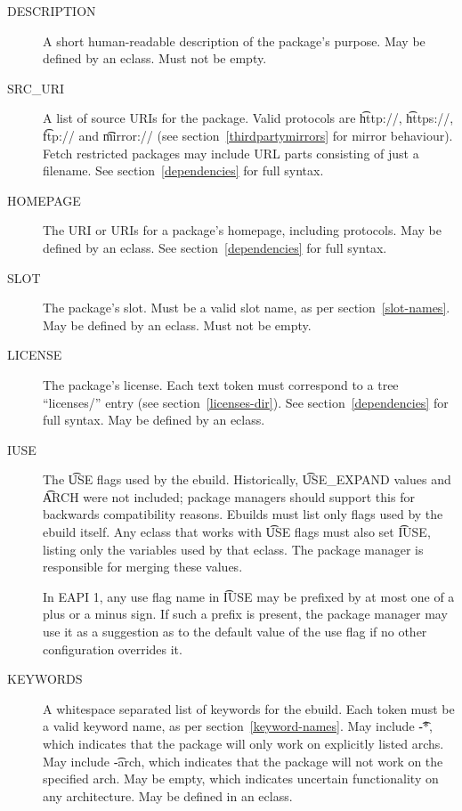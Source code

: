 \begin{description}
\item[DESCRIPTION] A short human-readable description of the package's purpose. May be defined by an
    eclass. Must not be empty.
\item[SRC\_URI] A list of source URIs for the package. Valid protocols are \t{http://},
    \t{https://}, \t{ftp://} and \t{mirror://} (see section~\ref{thirdpartymirrors} for mirror behaviour).
    Fetch restricted packages may include URL parts consisting of just a filename. See
    section~\ref{dependencies} for full syntax.
\item[HOMEPAGE] The URI or URIs for a package's homepage, including protocols. May be defined by an
    eclass. See section~\ref{dependencies} for full syntax.
\item[SLOT] The package's slot. Must be a valid slot name, as per section~\ref{slot-names}. May
    be defined by an eclass. Must not be empty.
\item[LICENSE] The package's license. Each text token must correspond to a tree ``licenses/'' entry
    (see section~\ref{licenses-dir}). See section~\ref{dependencies} for full syntax.
    May be defined by an eclass. \label{ebuild-var-LICENSE}
\item[IUSE] The \t{USE} flags used by the ebuild. Historically, \t{USE\_EXPAND} values and \t{ARCH}
    were not included; package managers should support this for backwards compatibility reasons. Ebuilds
    must list only flags used by the ebuild itself. Any eclass that works with \t{USE} flags
    must also set \t{IUSE}, listing only the variables used by that eclass. The package manager is
    responsible for merging these values.

    In EAPI 1, any use flag name in \t{IUSE} may be prefixed by at most one of a plus or a minus
    sign. If such a prefix is present, the package manager may use it as a suggestion as to the
    default value of the use flag if no other configuration overrides it.
\item[KEYWORDS] A whitespace separated list of keywords for the ebuild. Each token must be a
    valid keyword name, as per section~\ref{keyword-names}. May include \t{-*}, which
    indicates that the package will only work on explicitly listed archs. May include \t{-arch},
    which indicates that the package will not work on the specified arch. May be empty, which
    indicates uncertain functionality on any architecture. May be defined in an eclass.
\end{description}

